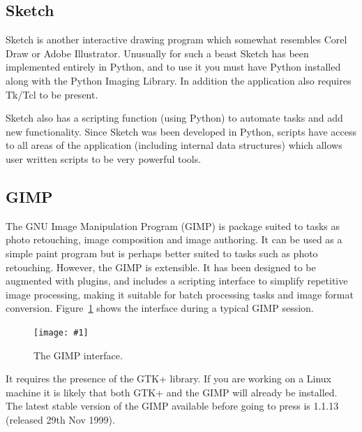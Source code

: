 \documentclass[twoside,11pt]{article}
\newcommand{\htmladdnormallink}[2]{#1}
\newcommand{\htmladdimg}[1]{}
\newcommand{\htmlref}[2]{#1}
\newcommand{\xlabel}[1]{}
\newcommand{\myfig} [5] {
  \begin{figure}
    \centering\texttt{[image: \#1]}
    \typeout{#1 inserted on page \arabic{page}}
    \caption{\label{#4}#5}
  \end{figure}
  }
\newcommand{\myfig}[5]{
    \label{#4} \htmladdimg{#3}\\
    Figure: #5\\
    }
\begin{document}
\subsection{\xlabel{sc15_sketch}Sketch\label{sc15_sketch}}

\htmladdnormallink{Sketch}{http://sketch.sourceforge.net/} is another interactive drawing program which somewhat resembles Corel Draw or Adobe Illustrator. Unusually for such a beast Sketch has been implemented entirely in Python, and to use it you must have Python installed along with the \htmlref{Python Imaging Library}{sc15_pythonimg}. In addition the application also requires Tk/Tcl to be present.

Sketch also has a scripting function (using Python) to automate tasks and add new functionality. Since Sketch was been developed in Python,  scripts have access to all areas of the application (including internal data structures) which allows user written scripts to be very powerful tools.

\subsection{\xlabel{sc15_gimp}GIMP\label{sc15_gimp}}

The \htmladdnormallink{GNU Image Manipulation Program}{http://www.gimp.org/} (GIMP) is package suited to tasks as photo retouching, image composition and image authoring. It can be used as a simple paint program but is perhaps better suited to tasks such as photo retouching. However, the GIMP is extensible. It has been designed to be augmented with plugins, and includes a scripting interface to simplify repetitive image processing, making it suitable for batch processing tasks and image format conversion. Figure~\ref{sc15_gimp_interface} shows the interface during a typical GIMP session.

\myfig{sc15_gimp.eps}{height=0.8\textheight}{sc15_gimp.gif}{sc15_gimp_interface}{The GIMP interface.} 

It requires the presence of the \htmladdnormallink{GTK+}{http://www.gtk.org/} library. If you are working on a Linux machine it is likely that both GTK+ and the GIMP will already be installed. The latest stable version of the GIMP available before going to press is 1.1.13 (released 29th Nov 1999).
\end{document}
